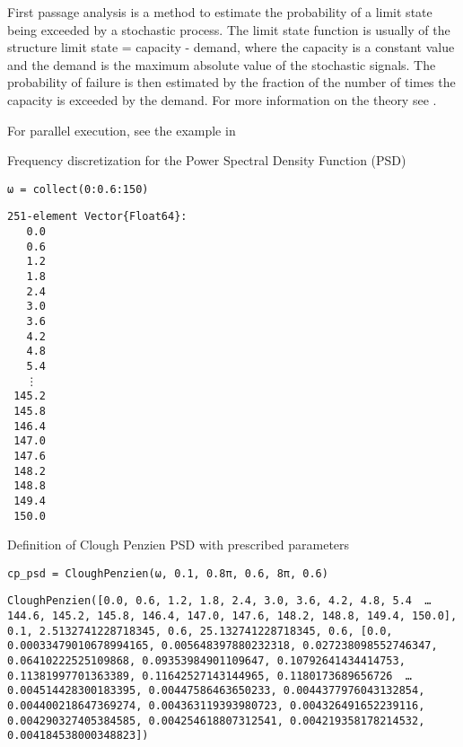 First passage analysis is a method to estimate the probability of a limit state being exceeded by a stochastic process. The limit state function is usually of the structure {\textquotedbl}limit state = capacity - demand{\textquotedbl}, where the capacity is a constant value and the demand is the maximum absolute value of the stochastic signals. The probability of failure is then estimated by the fraction of the number of times the capacity is exceeded by the demand. For more information on the theory see .



For parallel execution, see the example in 





Frequency discretization for the Power Spectral Density Function (PSD)




\begin{verbatim}
ω = collect(0:0.6:150)
\end{verbatim}


\begin{verbatim}
251-element Vector{Float64}:
   0.0
   0.6
   1.2
   1.8
   2.4
   3.0
   3.6
   4.2
   4.8
   5.4
   ⋮
 145.2
 145.8
 146.4
 147.0
 147.6
 148.2
 148.8
 149.4
 150.0
\end{verbatim}



Definition of Clough Penzien PSD with prescribed parameters




\begin{verbatim}
cp_psd = CloughPenzien(ω, 0.1, 0.8π, 0.6, 8π, 0.6)
\end{verbatim}


\begin{verbatim}
CloughPenzien([0.0, 0.6, 1.2, 1.8, 2.4, 3.0, 3.6, 4.2, 4.8, 5.4  …  144.6, 145.2, 145.8, 146.4, 147.0, 147.6, 148.2, 148.8, 149.4, 150.0], 0.1, 2.5132741228718345, 0.6, 25.132741228718345, 0.6, [0.0, 0.00033479010678994165, 0.005648397880232318, 0.027238098552746347, 0.06410222525109868, 0.09353984901109647, 0.10792641434414753, 0.11381997701363389, 0.11642527143144965, 0.1180173689656726  …  0.004514428300183395, 0.00447586463650233, 0.0044377976043132854, 0.004400218647369274, 0.004363119393980723, 0.004326491652239116, 0.004290327405384585, 0.004254618807312541, 0.004219358178214532, 0.004184538000348823])
\end{verbatim}



